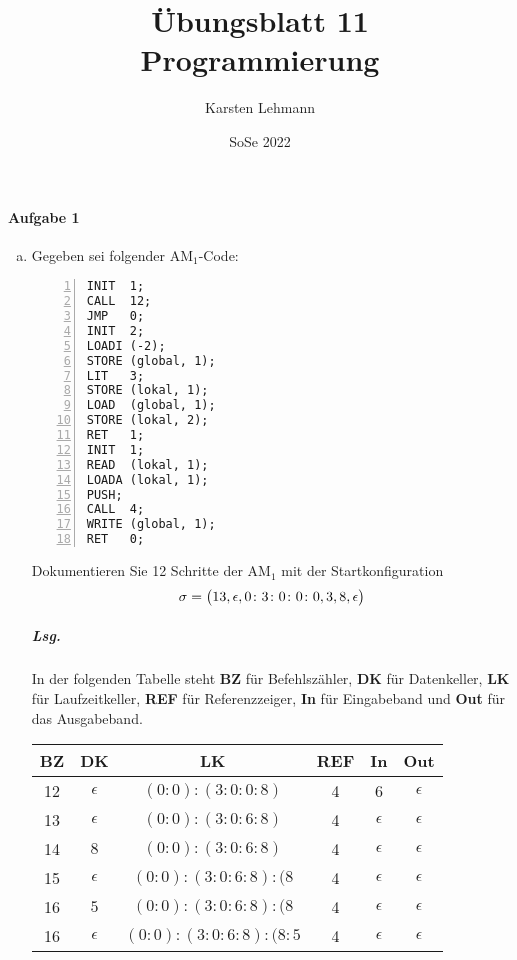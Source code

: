 \documentclass{scrreprt}
\author{Karsten Lehmann}
\date{SoSe 2022}
\title{Übungsblatt 11\\Programmierung}
\begin{document}
\paragraph{Aufgabe 1}
\begin{enumerate}[(a)]
\item Gegeben sei folgender $\text{AM}_1$-Code:
  \begin{footnotesize}
  \begin{lstlisting}[numbers=left, multicols=3]
INIT  1;
CALL  12;
JMP   0;
INIT  2;
LOADI (-2);
STORE (global, 1);
LIT   3;
STORE (lokal, 1);
LOAD  (global, 1);
STORE (lokal, 2);
RET   1;
INIT  1;
READ  (lokal, 1);
LOADA (lokal, 1);
PUSH;
CALL  4;
WRITE (global, 1);
RET   0;
  \end{lstlisting}
  \end{footnotesize}
  Dokumentieren Sie 12 Schritte der $\text{AM}_1$ mit der Startkonfiguration
  \[
    \sigma = \qty\big(
      13, \epsilon, 0 \colon 3 \colon 0 \colon 0 \colon 0, 3, 8, \epsilon
    )
  \]

  \subparagraph{Lsg.} In der folgenden Tabelle steht \textbf{BZ} für
  Befehlszähler, \textbf{DK} für Datenkeller, \textbf{LK} für Laufzeitkeller,
  \textbf{REF} für Referenzzeiger, \textbf{In} für Eingabeband und \textbf{Out}
  für das Ausgabeband. \\

  \begin{tabular}{|c|c|c|c|c|c|}
    \hline
    BZ & DK & LK & REF & In & Out \\
    \hline
    12 & $\epsilon$ & $(0 \colon 0) \colon (3 \colon 0 \colon 0 \colon 8)$ & 4 & 6 & $\epsilon$ \\
    \hline
    13 & $\epsilon$ & $(0 \colon 0) \colon (3 \colon 0 \colon 6 \colon 8)$ & 4 & $\epsilon$ & $\epsilon$ \\
    \hline
    14 & $8$ & $(0 \colon 0) \colon (3 \colon 0 \colon 6 \colon 8)$ & 4 & $\epsilon$ & $\epsilon$ \\
    \hline
    15 & $\epsilon$ & $(0 \colon 0) \colon (3 \colon 0 \colon 6 \colon 8) \colon (8$ & 4 & $\epsilon$ & $\epsilon$ \\
    \hline
    16 & $5$ & $(0 \colon 0) \colon (3 \colon 0 \colon 6 \colon 8) \colon (8$ & 4 & $\epsilon$ & $\epsilon$ \\
    \hline
    16 & $\epsilon$ & $(0 \colon 0) \colon (3 \colon 0 \colon 6 \colon 8) \colon (8 \colon 5$ & 4 & $\epsilon$ & $\epsilon$ \\
    \hline
  \end{tabular}

\end{enumerate}
\end{document}
